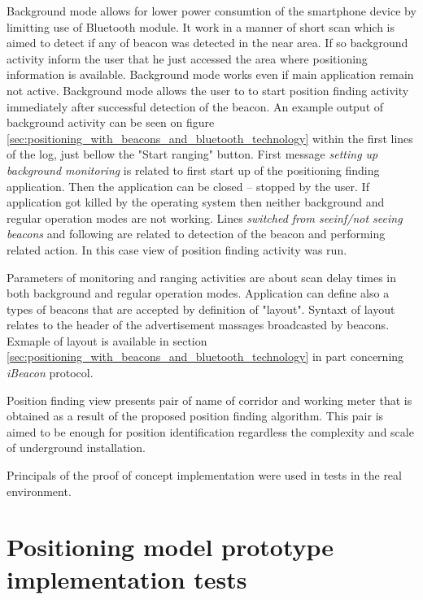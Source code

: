 \documentclass[../main.tex]{subfiles}
\begin{document}
Background mode allows for lower power consumtion of the smartphone device by limitting use of Bluetooth module. It work in a manner of short scan which is aimed to detect if any of beacon was detected in the near area. If so background activity inform the user that he just accessed the area where positioning information is available. Background mode works even if main application remain not active. Background mode allows the user to to start position finding activity immediately after successful detection of the beacon. An example output of background activity can be seen on figure \ref{sec:positioning_with_beacons_and_bluetooth_technology} within the first lines of the log, just bellow the "Start ranging" button. First message \textit{setting up background monitoring} is related to first start up of the positioning finding application. Then the application can be closed -- stopped by the user. If application got killed by the operating system then neither background and regular operation modes are not working. Lines \textit{switched from seeinf/not seeing beacons} and following are related to detection of the beacon and performing related action. In this case view of position finding activity was run.

Parameters of monitoring and ranging activities are about scan delay times in both background and regular operation modes. Application can define also a types of beacons that are accepted by definition of "layout". Syntaxt of layout relates to the header of the advertisement massages broadcasted by beacons. Exmaple of layout is available in section \ref{sec:positioning_with_beacons_and_bluetooth_technology} in part concerning \textit{iBeacon} protocol.

Position finding view presents pair of name of corridor and working meter that is obtained as a result of the proposed position finding algorithm. This pair is aimed to be enough for position identification regardless the complexity and scale of underground installation.

Principals of the proof of concept implementation were used in tests in the real environment.


\chapter{Positioning model prototype implementation tests}
\label{ch:localization_system_tests}
\end{document}
